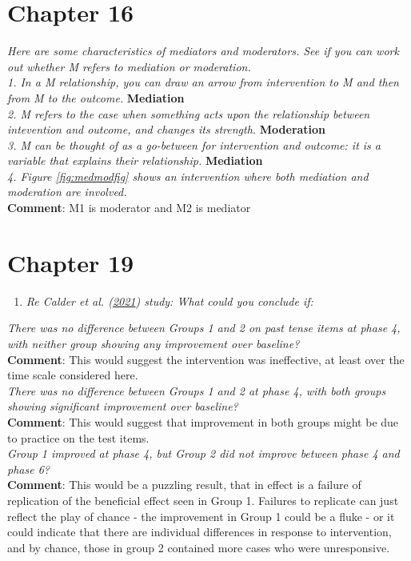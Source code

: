 \documentclass{krantz}
\providecommand{\tightlist}{%
\setlength{\itemsep}{0pt}\setlength{\parskip}{0pt}}
\begin{document}
\hypertarget{chapter-16}{%
\section{Chapter 16}\label{chapter-16}}

\emph{Here are some characteristics of mediators and moderators. See if you can work out whether M refers to mediation or moderation.}\\
\emph{1. In a M relationship, you can draw an arrow from intervention to M and then from M to the outcome.} \textbf{Mediation}\\
\emph{2. M refers to the case when something acts upon the relationship between intevention and outcome, and changes its strength.} \textbf{Moderation}\\
\emph{3. M can be thought of as a go-between for intervention and outcome: it is a variable that explains their relationship.} \textbf{Mediation}\\
\emph{4. Figure \ref{fig:medmodfig} shows an intervention where both mediation and moderation are involved.}\\
\textbf{Comment}: M1 is moderator and M2 is mediator

\hypertarget{chapter-19}{%
\section{Chapter 19}\label{chapter-19}}

\begin{enumerate}
\def\labelenumi{\arabic{enumi}.}
\tightlist
\item
  \emph{Re Calder et al. (\protect\hyperlink{ref-calder2021}{2021}) study: What could you conclude if:}
\end{enumerate}

\emph{There was no difference between Groups 1 and 2 on past tense items at phase 4, with neither group showing any improvement over baseline?}\\
\textbf{Comment}: This would suggest the intervention was ineffective, at least over the time scale considered here.\\
\emph{There was no difference between Groups 1 and 2 at phase 4, with both groups showing significant improvement over baseline?}\\
\textbf{Comment}: This would suggest that improvement in both groups might be due to practice on the test items.\\
\emph{Group 1 improved at phase 4, but Group 2 did not improve between phase 4 and phase 6?}\\
\textbf{Comment}: This would be a puzzling result, that in effect is a failure of replication of the beneficial effect seen in Group 1. Failures to replicate can just reflect the play of chance - the improvement in Group 1 could be a fluke - or it could indicate that there are individual differences in response to intervention, and by chance, those in group 2 contained more cases who were unresponsive.
\end{document}
